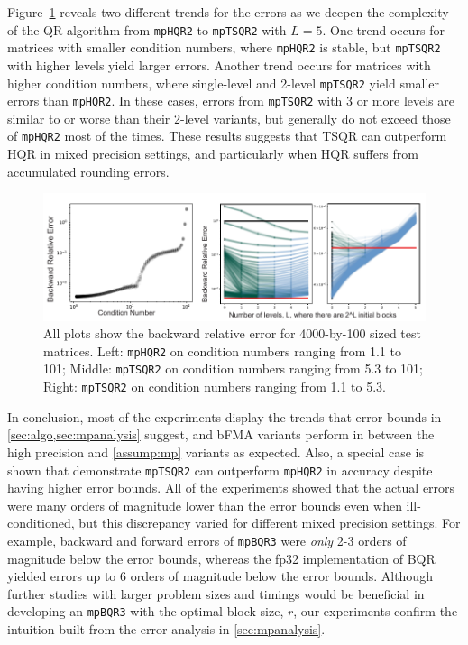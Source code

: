 \documentclass[review,onefignum,onetabnum]{siamart190516}
\begin{document}
Figure~\ref{fig:allTSQR} reveals two different trends for the errors as we deepen the complexity of the QR algorithm from {\tt mpHQR2} to {\tt mpTSQR2} with $L=5$. 
One trend occurs for matrices with smaller condition numbers, where {\tt mpHQR2} is stable, but {\tt mpTSQR2} with higher levels yield larger errors. 
Another trend occurs for matrices with higher condition numbers, where single-level and 2-level {\tt mpTSQR2} yield smaller errors than {\tt mpHQR2}. 
In these cases, errors from {\tt mpTSQR2} with 3 or more levels are similar to or worse than their 2-level variants, but generally do not exceed those of {\tt mpHQR2} most of the times.
These results suggests that TSQR can outperform HQR in mixed precision settings, and particularly when HQR suffers from accumulated rounding errors.
\begin{figure}[h!]%
	\centering
	\includegraphics[width=\textwidth]{../figures/allTSQR3.pdf}
	\vspace{-15pt}
	\caption{\label{fig:allTSQR} All plots show the backward relative error for 4000-by-100 sized test matrices. Left: {\tt mpHQR2} on condition numbers ranging from 1.1 to 101;  Middle: {\tt mpTSQR2} on condition numbers ranging from 5.3 to 101; Right:  {\tt mpTSQR2} on condition numbers ranging from 1.1 to 5.3. }
	\vspace{-5pt}
\end{figure}

In conclusion, most of the experiments display the trends that error bounds in \cref{sec:algo,sec:mpanalysis} suggest, and bFMA variants perform in between the high precision and \cref{assump:mp} variants as expected.
Also, a special case is shown that demonstrate {\tt mpTSQR2} can outperform {\tt mpHQR2} in accuracy despite having higher error bounds.
All of the experiments showed that the actual errors were many orders of magnitude lower than the error bounds even when ill-conditioned, but this discrepancy varied for different mixed precision settings.
For example, backward and forward errors of {\tt mpBQR3} were \emph{only} 2-3 orders of magnitude below the error bounds, whereas the fp32 implementation of BQR yielded errors up to 6 orders of magnitude below the error bounds.
Although further studies with larger problem sizes and timings would be beneficial in developing an {\tt mpBQR3} with the optimal block size, $r$, our experiments confirm the intuition built from the error analysis in \cref{sec:mpanalysis}.
\end{document}
